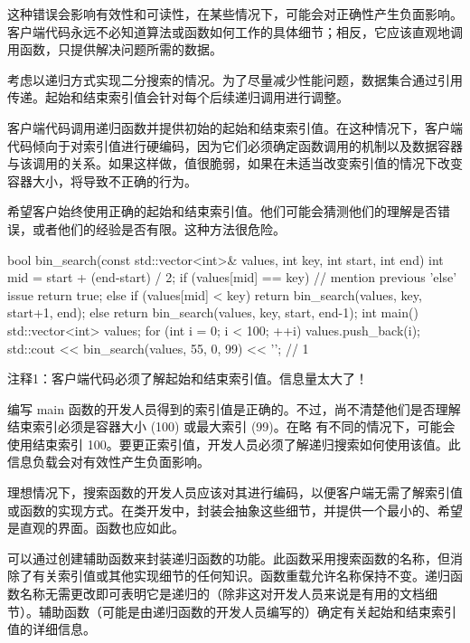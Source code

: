 这种错误会影响有效性和可读性，在某些情况下，可能会对正确性产生负面影响。客户端代码永远不必知道算法或函数如何工作的具体细节；相反，它应该直观地调用函数，只提供解决问题所需的数据。


考虑以递归方式实现二分搜索的情况。为了尽量减少性能问题，数据集合通过引用传递。起始和结束索引值会针对每个后续递归调用进行调整。

客户端代码调用递归函数并提供初始的起始和结束索引值。在这种情况下，客户端代码倾向于对索引值进行硬编码，因为它们必须确定函数调用的机制以及数据容器与该调用的关系。如果这样做，值很脆弱，如果在未适当改变索引值的情况下改变容器大小，将导致不正确的行为。

希望客户始终使用正确的起始和结束索引值。他们可能会猜测他们的理解是否错误，或者他们的经验是否有限。这种方法很危险。


\begin{cpp}
bool bin_search(const std::vector<int>& values, int key, int start, int end)
{
  int mid = start + (end-start) / 2;
  if (values[mid] == key) // mention previous 'else' issue
    return true;
  else if (values[mid] < key)
    return bin_search(values, key, start+1, end);
  else
    return bin_search(values, key, start, end-1);
}
int main() {
  std::vector<int> values;
  for (int i = 0; i < 100; ++i)
    values.push_back(i);
  std::cout << bin_search(values, 55, 0, 99) << '\n'; // 1
}
\end{cpp}

{\footnotesize
注释1：客户端代码必须了解起始和结束索引值。信息量太大了！
}


编写 main 函数的开发人员得到的索引值是正确的。不过，尚不清楚他们是否理解结束索引必须是容器大小 (100) 或最大索引 (99)。在略 有不同的情况下，可能会使用结束索引 100。要更正索引值，开发人员必须了解递归搜索如何使用该值。此信息负载会对有效性产生负面影响。

理想情况下，搜索函数的开发人员应该对其进行编码，以便客户端无需了解索引值或函数的实现方式。在类开发中，封装会抽象这些细节，并提供一个最小的、希望是直观的界面。函数也应如此。


可以通过创建辅助函数来封装递归函数的功能。此函数采用搜索函数的名称，但消除了有关索引值或其他实现细节的任何知识。函数重载允许名称保持不变。递归函数名称无需更改即可表明它是递归的（除非这对开发人员来说是有用的文档细节）。辅助函数（可能是由递归函数的开发人员编写的）确定有关起始和结束索引值的详细信息。

